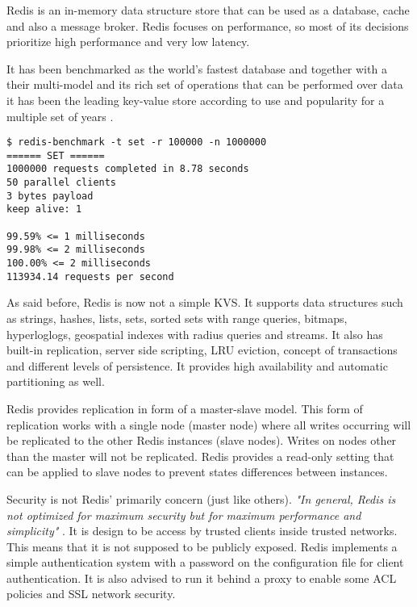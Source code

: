 Redis \cite{redis:1} is an in-memory data structure store that can be used as a database, cache and also a message broker. Redis focuses on performance, so most of its decisions prioritize high performance and very low latency.

It has been benchmarked as the world's fastest database \cite{redis:3} and together with a their multi-model and its rich set of operations that can be performed over data it has been the leading key-value store according to use and popularity for a multiple set of years \cite{db-engine:2}.

\lstset{language=Bash, caption=How Fast is Redis, label=lst:redisBenchmark}
\begin{lstlisting}
$ redis-benchmark -t set -r 100000 -n 1000000
====== SET ======
1000000 requests completed in 8.78 seconds
50 parallel clients
3 bytes payload
keep alive: 1

99.59% <= 1 milliseconds
99.98% <= 2 milliseconds
100.00% <= 2 milliseconds
113934.14 requests per second
\end{lstlisting}

As said before, Redis is now not a simple \gls{KVS}. It supports data structures such as strings, hashes, lists, sets, sorted sets with range queries, bitmaps, hyperloglogs, geospatial indexes with radius queries and streams. It also has built-in replication, server side scripting, \gls{LRU} eviction, concept of transactions and different levels of persistence. It provides high availability and automatic partitioning as well.

Redis provides replication in form of a master-slave model. This form of replication works with a single node (master node) where all writes occurring will be replicated to the other Redis instances (slave nodes). Writes on nodes other than the master will not be replicated. Redis provides a read-only setting that can be applied to slave nodes to prevent states differences between instances.

Security is not Redis' primarily concern (just like others). \textit{"In general, Redis is not optimized for maximum security but for maximum performance and simplicity"} \cite{redis:4}. It is design to be access by trusted clients inside trusted networks. This means that it is not supposed to be publicly exposed. Redis implements a simple authentication system with a password on the configuration file for client authentication.
It is also advised to run it behind a proxy to enable some \gls{ACL} policies and \gls{SSL} network security.

